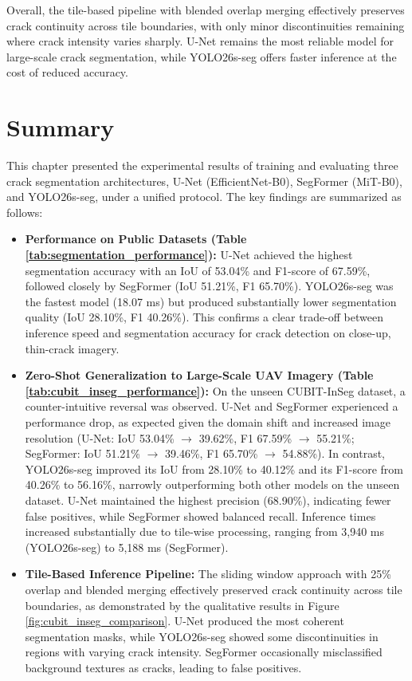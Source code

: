 \hs Overall, the tile-based pipeline with blended overlap merging effectively preserves crack continuity across tile boundaries, with only minor discontinuities remaining where crack intensity varies sharply. U-Net remains the most reliable model for large-scale crack segmentation, while YOLO26s-seg offers faster inference at the cost of reduced accuracy.

\section{Summary}
\label{sec:summary}
\hs This chapter presented the experimental results of training and evaluating three crack segmentation architectures, U-Net (EfficientNet-B0), SegFormer (MiT-B0), and YOLO26s-seg, under a unified protocol. The key findings are summarized as follows:

\begin{itemize}
    \item \textbf{Performance on Public Datasets (Table \ref{tab:segmentation_performance}):} U-Net achieved the highest segmentation accuracy with an IoU of 53.04\% and F1-score of 67.59\%, followed closely by SegFormer (IoU 51.21\%, F1 65.70\%). YOLO26s-seg was the fastest model (18.07 ms) but produced substantially lower segmentation quality (IoU 28.10\%, F1 40.26\%). This confirms a clear trade-off between inference speed and segmentation accuracy for crack detection on close-up, thin-crack imagery.

    \item \textbf{Zero-Shot Generalization to Large-Scale UAV Imagery (Table \ref{tab:cubit_inseg_performance}):} On the unseen CUBIT-InSeg dataset, a counter-intuitive reversal was observed. U-Net and SegFormer experienced a performance drop, as expected given the domain shift and increased image resolution (U-Net: IoU 53.04\% $\rightarrow$ 39.62\%, F1 67.59\% $\rightarrow$ 55.21\%; SegFormer: IoU 51.21\% $\rightarrow$ 39.46\%, F1 65.70\% $\rightarrow$ 54.88\%). In contrast, YOLO26s-seg improved its IoU from 28.10\% to 40.12\% and its F1-score from 40.26\% to 56.16\%, narrowly outperforming both other models on the unseen dataset. U-Net maintained the highest precision (68.90\%), indicating fewer false positives, while SegFormer showed balanced recall. Inference times increased substantially due to tile-wise processing, ranging from 3,940 ms (YOLO26s-seg) to 5,188 ms (SegFormer).

    \item \textbf{Tile-Based Inference Pipeline:} The sliding window approach with 25\% overlap and blended merging effectively preserved crack continuity across tile boundaries, as demonstrated by the qualitative results in Figure \ref{fig:cubit_inseg_comparison}. U-Net produced the most coherent segmentation masks, while YOLO26s-seg showed some discontinuities in regions with varying crack intensity. SegFormer occasionally misclassified background textures as cracks, leading to false positives.
\end{itemize}